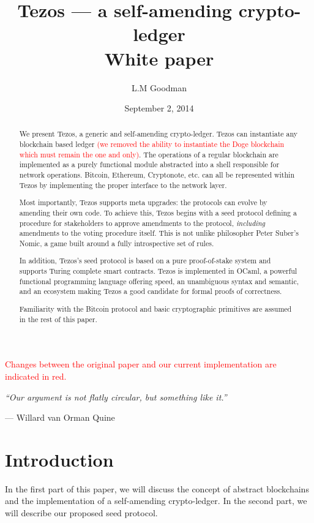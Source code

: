 \documentclass[letterpaper]{article}
\author{L.M Goodman}
\date{September 2, 2014}
\title{Tezos --- a self-amending crypto-ledger \\ White paper}
\newcommand\change[1]{\textcolor{red}{#1}}
\begin{document}
\maketitle


\change{Changes between the original paper and our current implementation are indicated in red.}

\epigraph{\emph{``Our argument is not flatly circular,
but something like it.''}}
{--- \textup{Willard van Orman Quine}}


\begin{abstract}
We present Tezos, a generic and self-amending crypto-ledger. Tezos can
instantiate any blockchain based ledger \change{(we removed the ability to instantiate
the Doge blockchain which must remain the one and only)}. The operations of a regular blockchain
are implemented as a purely functional module abstracted into a shell
responsible for network operations. Bitcoin, Ethereum, Cryptonote, etc. can all
be represented within Tezos by implementing the proper interface to the network
layer.

Most importantly, Tezos supports meta upgrades: the protocols can evolve by
amending their own code. To achieve this, Tezos begins with a seed protocol
defining a procedure for stakeholders to approve amendments to the protocol,
\emph{including} amendments to the voting procedure itself. This is not unlike
philosopher Peter Suber's Nomic\cite{Nomic}, a game built around a fully
introspective set of rules.

In addition, Tezos's seed protocol is based on a pure proof-of-stake system
and supports Turing complete smart contracts. Tezos is implemented in OCaml,
a powerful functional programming language offering speed, an unambiguous
syntax and semantic, and an ecosystem making Tezos a good candidate for formal
proofs of correctness.

Familiarity with the Bitcoin protocol and basic cryptographic primitives are
assumed in the rest of this paper.

\end{abstract}
\newpage

\tableofcontents
\newpage

\section{Introduction}
In the first part of this paper, we will discuss the concept of abstract
blockchains and the implementation of a self-amending crypto-ledger.
In the second part, we will describe our proposed seed protocol.
\end{document}
